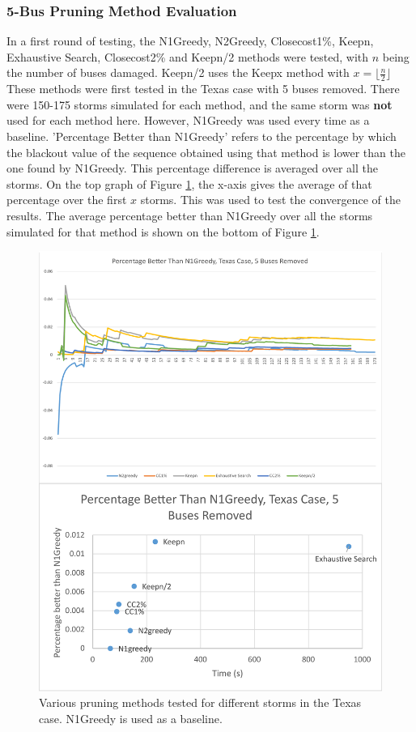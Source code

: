 \documentclass[12pt]{article}
\begin{document}
\subsubsection{5-Bus Pruning Method Evaluation} \label{5buseval}

In a first round of testing, the N1Greedy, N2Greedy, Closecost1\%, Keepn, Exhaustive Search, Closecost2\% and Keepn/2 methods were tested, with $n$ being the number of buses damaged. Keepn/2 uses the Keepx method with $x = \lfloor \frac{n}{2} \rfloor$  These methods were first tested in the Texas case with 5 buses removed. There were 150-175 storms simulated for each method, and the same storm was \textbf{not} used for each method here. However, N1Greedy was used every time as a baseline. 'Percentage Better than N1Greedy' refers to the percentage by which the blackout value of the sequence obtained using that method is lower than the one found by N1Greedy. This percentage difference is averaged over all the storms. On the top graph of  Figure \ref{fig:Texas5busr1}, the x-axis gives the average of that percentage over the first $x$ storms. This was used to test the convergence of the results. The average percentage better than N1Greedy over all the storms simulated for that method is shown on the bottom of Figure \ref{fig:Texas5busr1}.

\begin{figure}[ht]
    \centering %
    \includegraphics[scale = 0.24]{Texas5busr1.pdf}
    \caption[Initial Testing - 5 buses removed, Texas Case]{Various pruning methods tested for different storms in the Texas case. N1Greedy is used as a baseline.}
    \label{fig:Texas5busr1}
\end{figure}
\end{document}
